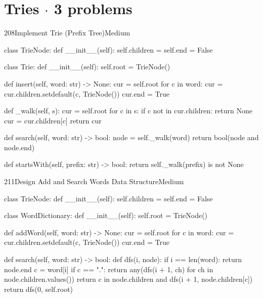 \section{Tries \texorpdfstring{{\normalsize\color{muted}$\cdot$ 3 problems}}{- 3 problems}}

\begin{problem}{208}{Implement Trie (Prefix Tree)}{Medium}
\begin{code}
class TrieNode:
    def __init__(self):
        self.children = {}
        self.end = False

class Trie:
    def __init__(self):
        self.root = TrieNode()

    def insert(self, word: str) -> None:
        cur = self.root
        for c in word:
            cur = cur.children.setdefault(c, TrieNode())
        cur.end = True

    def _walk(self, s):
        cur = self.root
        for c in s:
            if c not in cur.children:
                return None
            cur = cur.children[c]
        return cur

    def search(self, word: str) -> bool:
        node = self._walk(word)
        return bool(node and node.end)

    def startsWith(self, prefix: str) -> bool:
        return self._walk(prefix) is not None
\end{code}
\end{problem}

\begin{problem}{211}{Design Add and Search Words Data Structure}{Medium}
\begin{code}
class TrieNode:
    def __init__(self):
        self.children = {}
        self.end = False

class WordDictionary:
    def __init__(self):
        self.root = TrieNode()

    def addWord(self, word: str) -> None:
        cur = self.root
        for c in word:
            cur = cur.children.setdefault(c, TrieNode())
        cur.end = True

    def search(self, word: str) -> bool:
        def dfs(i, node):
            if i == len(word):
                return node.end
            c = word[i]
            if c == ".":
                return any(dfs(i + 1, ch) for ch in node.children.values())
            return c in node.children and dfs(i + 1, node.children[c])
        return dfs(0, self.root)
\end{code}
\end{problem}

